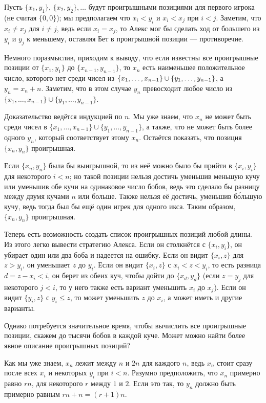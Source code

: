 Пусть $\{x_1 , y_1\}$, $\{x_2 , y_2\},\dots$ будут проигрышными позициями для первого игрока (не считая $\{0, 0\}$);
мы предполагаем что $x_i < y_i$ и $x_i < x_j$ при $i < j$.
Заметим, что $x_i \ne x_j$ для $i \ne j$, ведь если $x_i = x_j$, то Алекс мог бы сделать ход от большего из $y_i$ и $y_j$ к меньшему, оставляя Бет в проигрышной позиции --- противоречие.

Немного поразмыслив, приходим к выводу, что если известны все проигрышные позиции от $\{x_1 , y_1\}$ до $\{x_{n-1}, y_{n-1}\}$, то $x_n$ есть наименьшее положительное число, которого нет среди чисел из $\{x_1, \dots , x_{n-1}\} \z\cup \{y_1, \dots , y_{n-1}\}$, а $y_n = x_n + n$.
Заметим, что в этом случае $y_n$ превосходит любое число из $\{x_1, \dots , x_{n-1}\} \cup \{y_1, \dots , y_{n-1}\}$.

Доказательство ведётся индукцией по $n$.
Мы уже знаем, что $x_n$ не может быть среди чисел в $\{x_1, \dots , x_{n-1}\} \cup \{y_1, \dots , y_{n-1}\}$, а также, что не может быть более одного $y_n$, который соответствует этому $x_n$.
Остаётся показать, что позиция $\{x_n, y_n\}$ проигрышная.

Если $\{x_n, y_n\}$ была бы выигрышной, то из неё можно было бы прийти в $\{x_i, y_i\}$ для некоторого $i < n$; но такой позиции нельзя достичь уменьшив меньшую кучу или уменьшив обе кучи на одинаковое число бобов, ведь это сделало бы разницу между двумя кучами $n$ или больше.
Также нельзя её достичь, уменьшив б\'{о}льшую кучу, ведь тогда был бы ещё один игрек для одного икса.
Таким образом, $\{x_n, y_n\}$ проигрышная.

Теперь есть возможность создать список проигрышных позиций любой длины.
Из этого легко вывести стратегию Алекса.
Если он столкнётся с $\{x_i , y_i\}$, он убирает один или два боба и надеется на ошибку.
Если он видит $\{x_i , z\}$ для $z > y_i$, он уменьшает $z$ до $y_i$.
Если он видит $\{x_i , z\}$ с $x_i < z < y_i$, то есть разница $d = z - x_i < i$, он берет из обеих куч, чтобы дойти до $\{x_d , y_d\}$ (если $z = y_j$ для некоторого $j < i$, то у него также есть вариант уменьшить $x_i$ до $x_j$).
Если он видит $\{y_i , z\}$ с $y_i \le z$, то может уменьшить $z$ до $x_i$, а может иметь и другие варианты.

Однако потребуется значительное время, чтобы вычислить все проигрышные позиции, скажем до тысячи бобов в каждой куче.
Может можно найти более явное описание проигрышных позиций?

Как мы уже знаем, $x_n$ лежит между $n$ и $2n$ для каждого $n$, ведь $x_n$ стоит сразу после всех $x_i$ и некоторых $y_i$ при $i < n$.
Разумно предположить, что $x_n$ примерно равно $rn$, для некоторого $r$ между $1$ и $2$.
Если это так, то $y_n$ должно быть примерно равным $rn + n = (r + 1)n$.

